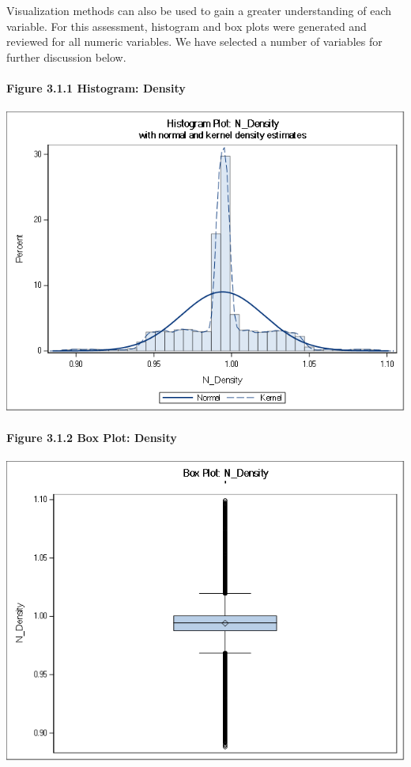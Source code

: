 \documentclass[]{article}
\let\oldparagraph\paragraph
\renewcommand{\paragraph}[1]{\oldparagraph{#1}\mbox{}}
\begin{document}
Visualization methods can also be used to gain a greater understanding
of each variable. For this assessment, histogram and box plots were
generated and reviewed for all numeric variables. We have selected a
number of variables for further discussion below.

\newpage

\paragraph{Figure 3.1.1 Histogram:
Density}\label{figure-3.1.1-histogram-density}

\includegraphics[height=3.95833in]{images/hist_density.png}

\paragraph{Figure 3.1.2 Box Plot:
Density}\label{figure-3.1.2-box-plot-density}

\includegraphics[height=3.95833in]{images/box_density.png}
\end{document}
